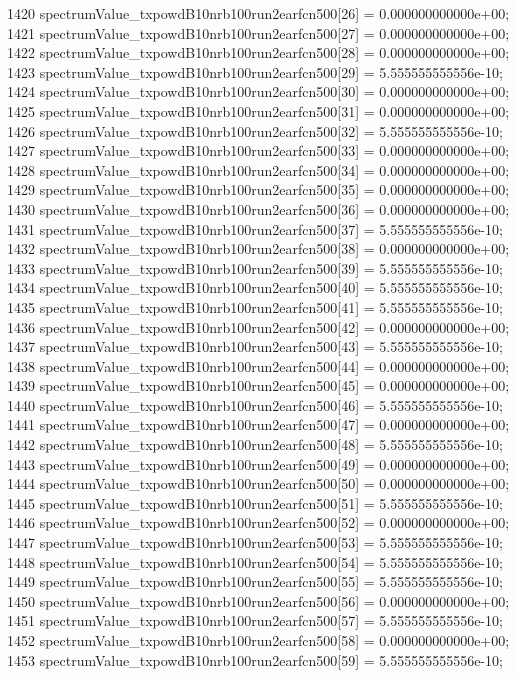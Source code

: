 \begin{DoxyCode}
1420   spectrumValue\_txpowdB10nrb100run2earfcn500[26] = 0.000000000000e+00;
1421   spectrumValue\_txpowdB10nrb100run2earfcn500[27] = 0.000000000000e+00;
1422   spectrumValue\_txpowdB10nrb100run2earfcn500[28] = 0.000000000000e+00;
1423   spectrumValue\_txpowdB10nrb100run2earfcn500[29] = 5.555555555556e-10;
1424   spectrumValue\_txpowdB10nrb100run2earfcn500[30] = 0.000000000000e+00;
1425   spectrumValue\_txpowdB10nrb100run2earfcn500[31] = 0.000000000000e+00;
1426   spectrumValue\_txpowdB10nrb100run2earfcn500[32] = 5.555555555556e-10;
1427   spectrumValue\_txpowdB10nrb100run2earfcn500[33] = 0.000000000000e+00;
1428   spectrumValue\_txpowdB10nrb100run2earfcn500[34] = 0.000000000000e+00;
1429   spectrumValue\_txpowdB10nrb100run2earfcn500[35] = 0.000000000000e+00;
1430   spectrumValue\_txpowdB10nrb100run2earfcn500[36] = 0.000000000000e+00;
1431   spectrumValue\_txpowdB10nrb100run2earfcn500[37] = 5.555555555556e-10;
1432   spectrumValue\_txpowdB10nrb100run2earfcn500[38] = 0.000000000000e+00;
1433   spectrumValue\_txpowdB10nrb100run2earfcn500[39] = 5.555555555556e-10;
1434   spectrumValue\_txpowdB10nrb100run2earfcn500[40] = 5.555555555556e-10;
1435   spectrumValue\_txpowdB10nrb100run2earfcn500[41] = 5.555555555556e-10;
1436   spectrumValue\_txpowdB10nrb100run2earfcn500[42] = 0.000000000000e+00;
1437   spectrumValue\_txpowdB10nrb100run2earfcn500[43] = 5.555555555556e-10;
1438   spectrumValue\_txpowdB10nrb100run2earfcn500[44] = 0.000000000000e+00;
1439   spectrumValue\_txpowdB10nrb100run2earfcn500[45] = 0.000000000000e+00;
1440   spectrumValue\_txpowdB10nrb100run2earfcn500[46] = 5.555555555556e-10;
1441   spectrumValue\_txpowdB10nrb100run2earfcn500[47] = 0.000000000000e+00;
1442   spectrumValue\_txpowdB10nrb100run2earfcn500[48] = 5.555555555556e-10;
1443   spectrumValue\_txpowdB10nrb100run2earfcn500[49] = 0.000000000000e+00;
1444   spectrumValue\_txpowdB10nrb100run2earfcn500[50] = 0.000000000000e+00;
1445   spectrumValue\_txpowdB10nrb100run2earfcn500[51] = 5.555555555556e-10;
1446   spectrumValue\_txpowdB10nrb100run2earfcn500[52] = 0.000000000000e+00;
1447   spectrumValue\_txpowdB10nrb100run2earfcn500[53] = 5.555555555556e-10;
1448   spectrumValue\_txpowdB10nrb100run2earfcn500[54] = 5.555555555556e-10;
1449   spectrumValue\_txpowdB10nrb100run2earfcn500[55] = 5.555555555556e-10;
1450   spectrumValue\_txpowdB10nrb100run2earfcn500[56] = 0.000000000000e+00;
1451   spectrumValue\_txpowdB10nrb100run2earfcn500[57] = 5.555555555556e-10;
1452   spectrumValue\_txpowdB10nrb100run2earfcn500[58] = 0.000000000000e+00;
1453   spectrumValue\_txpowdB10nrb100run2earfcn500[59] = 5.555555555556e-10;

\end{DoxyCode}
